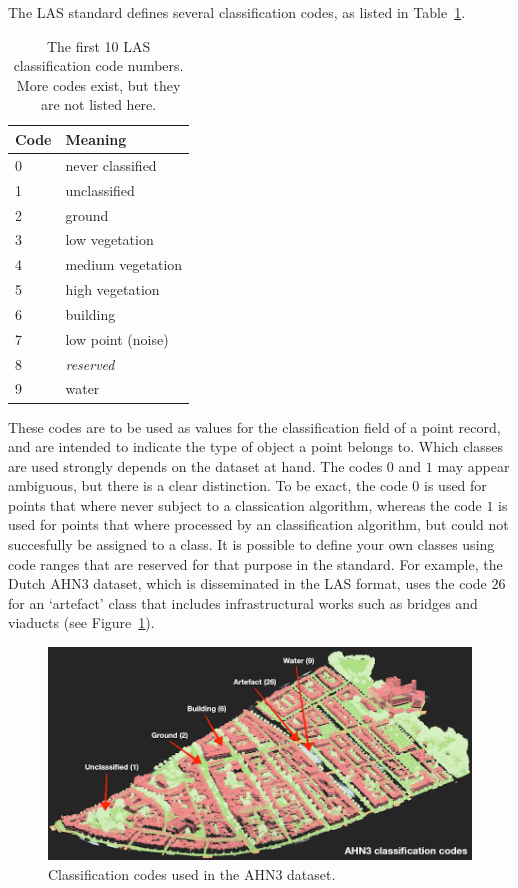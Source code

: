 The LAS standard defines several classification codes, as listed in Table~\ref{tab:las-classes}.
\begin{table}
  \centering
\begin{tabular}{l|l}
  Code & Meaning \\ \midrule
  0 & never classified \\
  1 & unclassified \\
  2 & ground \\
  3 & low vegetation \\
  4 & medium vegetation \\
  5 & high vegetation \\
  6 & building \\
  7 & low point (noise) \\
  8 & \emph{reserved} \\
  9 & water \\
\end{tabular}
\caption{The first 10 LAS classification code numbers. More codes exist, but they are not listed here.}
\label{tab:las-classes}
\end{table}
These codes are to be used as values for the classification field of a point record, and are intended to indicate the type of object a point belongs to.
Which classes are used strongly depends on the dataset at hand.
The codes $0$ and $1$ may appear ambiguous, but there is a clear distinction.
To be exact, the code $0$ is used for points that where never subject to a classication algorithm, whereas the code $1$ is used for points that where processed by an classification algorithm, but could not succesfully be assigned to a class.
It is possible to define your own classes using code ranges that are reserved for that purpose in the standard.
For example, the Dutch AHN3 dataset, which is disseminated in the LAS format, uses the code $26$ for an `artefact' class that includes infrastructural works such as bridges and viaducts (see Figure~\ref{fig:ahn3}).
\begin{figure}
  \includegraphics[width=\linewidth]{figs/ahn3.png}
  \caption{Classification codes used in the AHN3 dataset.}
  \label{fig:ahn3}
\end{figure}

